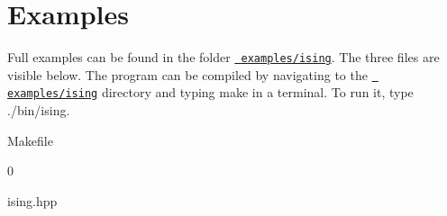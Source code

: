 \chapter{Examples}
\hypertarget{examples}{}\label{examples}
Full examples can be found in the folder \href{../examples/ising/}{\texttt{ examples/ising}}. The three files are visible below. The program can be compiled by navigating to the \href{../examples/ising}{\texttt{ examples/ising}} directory and typing {\ttfamily make} in a terminal. To run it, type {\ttfamily ./bin/ising}.


\begin{DoxyItemize}
\item Makefile
\end{DoxyItemize}


\begin{DoxyCodeInclude}{0}
\DoxyCodeLine{}

\end{DoxyCodeInclude}



\begin{DoxyItemize}
\item ising.\+hpp
\end{DoxyItemize}



